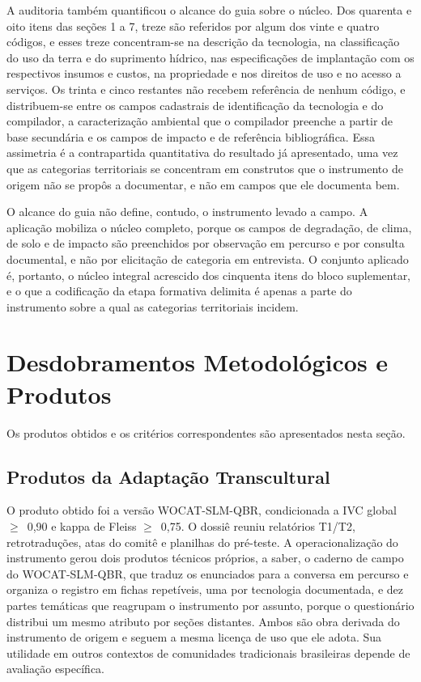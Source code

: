 \documentclass[preprint,authoryear,12pt]{elsarticle}
\begin{document}
A auditoria também quantificou o alcance do guia sobre o núcleo. Dos quarenta e oito itens das seções 1 a 7, treze são referidos por algum dos vinte e quatro códigos, e esses treze concentram-se na descrição da tecnologia, na classificação do uso da terra e do suprimento hídrico, nas especificações de implantação com os respectivos insumos e custos, na propriedade e nos direitos de uso e no acesso a serviços. Os trinta e cinco restantes não recebem referência de nenhum código, e distribuem-se entre os campos cadastrais de identificação da tecnologia e do compilador, a caracterização ambiental que o compilador preenche a partir de base secundária e os campos de impacto e de referência bibliográfica. Essa assimetria é a contrapartida quantitativa do resultado já apresentado, uma vez que as categorias territoriais se concentram em construtos que o instrumento de origem não se propôs a documentar, e não em campos que ele documenta bem.

O alcance do guia não define, contudo, o instrumento levado a campo. A aplicação mobiliza o núcleo completo, porque os campos de degradação, de clima, de solo e de impacto são preenchidos por observação em percurso e por consulta documental, e não por elicitação de categoria em entrevista. O conjunto aplicado é, portanto, o núcleo integral acrescido dos cinquenta itens do bloco suplementar, e o que a codificação da etapa formativa delimita é apenas a parte do instrumento sobre a qual as categorias territoriais incidem.


\section{Desdobramentos Metodológicos e Produtos}

Os produtos obtidos e os critérios correspondentes são apresentados nesta seção.



\subsection{Produtos da Adaptação Transcultural}

O produto obtido foi a versão WOCAT-SLM-QBR, condicionada a IVC global $\geq$~0,90 e kappa de Fleiss $\geq$~0,75. O dossiê reuniu relatórios T1/T2, retrotraduções, atas do comitê e planilhas do pré-teste. A operacionalização do instrumento gerou dois produtos técnicos próprios, a saber, o caderno de campo do WOCAT-SLM-QBR, que traduz os enunciados para a conversa em percurso e organiza o registro em fichas repetíveis, uma por tecnologia documentada, e dez partes temáticas que reagrupam o instrumento por assunto, porque o questionário distribui um mesmo atributo por seções distantes. Ambos são obra derivada do instrumento de origem e seguem a mesma licença de uso que ele adota. Sua utilidade em outros contextos de comunidades tradicionais brasileiras depende de avaliação específica.
\end{document}
